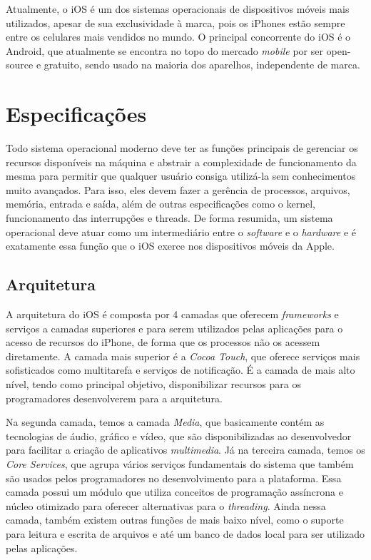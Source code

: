 \documentclass[conference]{IEEEtran}
\begin{document}
Atualmente, o iOS é um dos sistemas operacionais de dispositivos móveis mais utilizados, apesar de sua exclusividade à marca, pois os iPhones estão sempre entre os celulares mais vendidos no mundo. O principal concorrente do iOS é o Android, que atualmente se encontra no topo do mercado \textit{mobile} por ser open-source e gratuito, sendo usado na maioria dos aparelhos, independente de marca.

\section{Especificações}
Todo sistema operacional moderno deve ter as funções principais de gerenciar os recursos disponíveis na máquina e abstrair a complexidade de funcionamento da mesma para permitir que qualquer usuário consiga utilizá-la sem conhecimentos muito avançados. Para isso, eles devem fazer a gerência de processos, arquivos, memória, entrada e saída, além de outras especificações como o kernel, funcionamento das interrupções e threads. De forma resumida, um sistema operacional deve atuar como um intermediário entre o \textit{software} e o \textit{hardware} e é exatamente essa função que o iOS exerce nos dispositivos móveis da Apple.

\subsection{Arquitetura}
\label{arquitetura}
A arquitetura do iOS é composta por 4 camadas que oferecem \textit{frameworks} e serviços a camadas superiores e para serem utilizados pelas aplicações para o acesso de recursos do iPhone, de forma que os processos não os acessem diretamente. A camada mais superior é a \textit{Cocoa Touch}, que oferece serviços mais sofisticados como multitarefa e serviços de notificação. É a camada de mais alto nível, tendo como principal objetivo, disponibilizar recursos para os programadores desenvolverem para a arquitetura.

Na segunda camada, temos a camada \textit{Media}, que basicamente contém as tecnologias de áudio, gráfico e vídeo, que são disponibilizadas ao desenvolvedor para facilitar a criação de aplicativos \textit{multimedia}. Já na terceira camada, temos os \textit{Core Services}, que agrupa vários serviços fundamentais do sistema que também são usados pelos programadores no desenvolvimento para a plataforma. Essa camada possui um módulo que utiliza conceitos de programação assíncrona e núcleo otimizado para oferecer alternativas para o \textit{threading}. Ainda nessa camada, também existem outras funções de mais baixo nível, como o suporte para leitura e escrita de arquivos e até um banco de dados local para ser utilizado pelas aplicações. %
\end{document}
